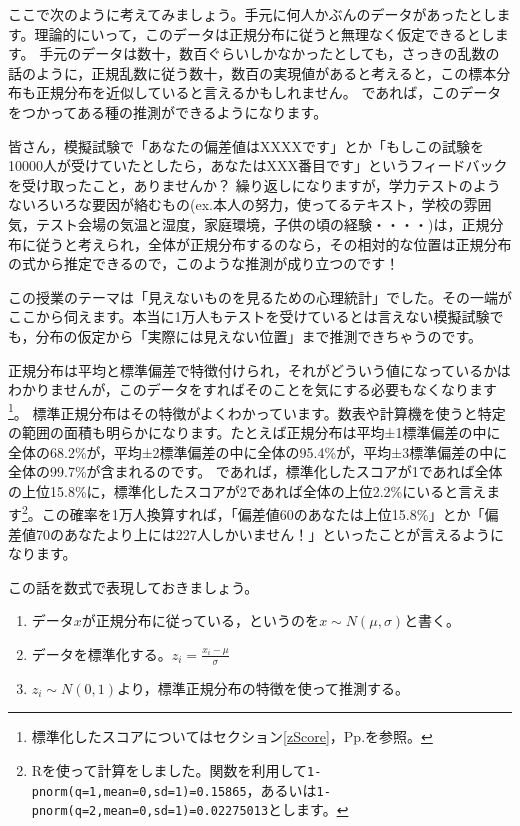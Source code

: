 \documentclass{ltjbook}
\begin{document}
ここで次のように考えてみましょう。手元に何人かぶんのデータがあったとします。理論的にいって，このデータは正規分布に従うと無理なく仮定できるとします。
手元のデータは数十，数百ぐらいしかなかったとしても，さっきの乱数の話のように，正規乱数に従う数十，数百の実現値があると考えると，この標本分布も正規分布を近似していると言えるかもしれません。
であれば，このデータをつかってある種の推測ができるようになります。

皆さん，模擬試験で「あなたの偏差値はXXXXです」とか「もしこの試験を10000人が受けていたとしたら，あなたはXXX番目です」というフィードバックを受け取ったこと，ありませんか？
繰り返しになりますが，学力テストのようないろいろな要因が絡むもの(ex.本人の努力，使ってるテキスト，学校の雰囲気，テスト会場の気温と湿度，家庭環境，子供の頃の経験・・・・)は，正規分布に従うと考えられ，全体が正規分布するのなら，その相対的な位置は正規分布の式から推定できるので，このような推測が成り立つのです！

この授業のテーマは「見えないものを見るための心理統計」でした。その一端がここから伺えます。本当に1万人もテストを受けているとは言えない模擬試験でも，分布の仮定から「実際には見えない位置」まで推測できちゃうのです。

正規分布は平均と標準偏差で特徴付けられ，それがどういう値になっているかはわかりませんが，このデータをすればそのことを気にする必要もなくなります\footnote{標準化したスコアについてはセクション\ref{zScore}，Pp.\pageref{zScore}を参照。}。
標準正規分布はその特徴がよくわかっています。数表や計算機を使うと特定の範囲の面積も明らかになります。たとえば正規分布は平均±1標準偏差の中に全体の68.2\%が，平均±2標準偏差の中に全体の95.4\%が，平均±3標準偏差の中に全体の99.7\%が含まれるのです。
であれば，標準化したスコアが1であれば全体の上位15.8\%に，標準化したスコアが2であれば全体の上位2.2\%にいると言えます\footnote{Rを使って計算をしました。関数を利用して\texttt{1-pnorm(q=1,mean=0,sd=1)=0.15865}，あるいは\texttt{1-pnorm(q=2,mean=0,sd=1)=0.02275013}とします。}。この確率を1万人換算すれば，「偏差値60のあなたは上位15.8\%」とか「偏差値70のあなたより上には227人しかいません！」といったことが言えるようになります。

この話を数式で表現しておきましょう。
\begin{enumerate}
	\item データ$x$が正規分布に従っている，というのを$x \sim N(\mu,\sigma)$と書く。
	\item データを標準化する。$z_i = \frac{x_i - \mu}{\sigma} $
	\item $z_i \sim N(0,1)$より，標準正規分布の特徴を使って推測する。
\end{enumerate}
\end{document}
